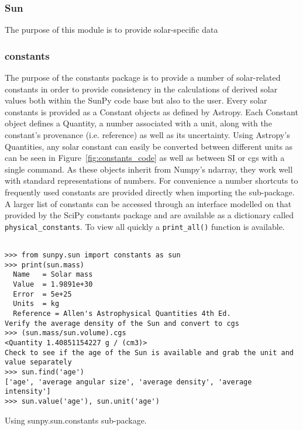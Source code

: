 \subsubsection{Sun}
The purpose of this module is to provide solar-specific data

\subsubsection{constants}
The purpose of the constants package is to provide a number of solar-related 
constants in order to provide consistency in the calculations of derived solar 
values both within the SunPy code base but also to the user. Every solar 
constants is provided as a Constant objects as defined by Astropy. Each 
Constant object defines a Quantity, a number associated with a unit, along with 
the constant's provenance (i.e. reference) as well as its uncertainty. Using 
Astropy's Quantities, any solar constant can easily be converted between 
different units as can be seen in Figure~\ref{fig:constants_code} as well
as between SI or cgs with a single command.  As these objects inherit from 
Numpy's ndarray, they work well with standard representations of numbers.
For convenience a number shortcuts to frequently used constants are provided 
directly when importing the sub-package. A larger list of constants can be 
accessed through an interface modelled on that provided by the SciPy constants 
package and are available as a dictionary called \texttt{physical\_constants}. 
To view all quickly a \texttt{print\_all()} function is available.

\begin{listing}[h]
\begin{verbatim}

>>> from sunpy.sun import constants as sun
>>> print(sun.mass)
  Name   = Solar mass
  Value  = 1.9891e+30
  Error  = 5e+25
  Units  = kg
  Reference = Allen's Astrophysical Quantities 4th Ed.
Verify the average density of the Sun and convert to cgs
>>> (sun.mass/sun.volume).cgs
<Quantity 1.40851154227 g / (cm3)>
Check to see if the age of the Sun is available and grab the unit and value separately
>>> sun.find('age')
['age', 'average angular size', 'average density', 'average intensity']
>>> sun.value('age'), sun.unit('age')

\end{verbatim}
\caption{Using sunpy.sun.constants sub-package.}
\label{code:constants_code}
\end{listing}
	